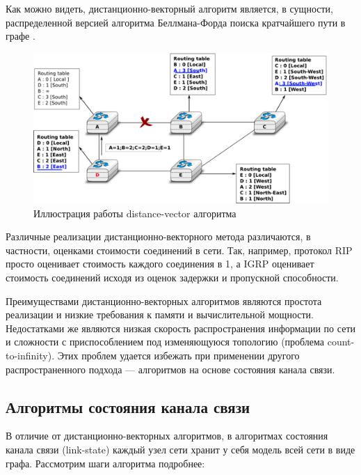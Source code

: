 \documentclass[specification, annotation]{itmo-student-thesis}
\begin{document}
Как можно видеть, дистанционно-векторный алгоритм является, в сущности,
распределенной версией алгоритма Беллмана-Форда поиска кратчайшего пути в
графе \cite{bellman-ford}.

\begin{figure}[!h]
  \caption{Иллюстрация работы distance-vector алгоритма}\label{rip-img}
  \centering
  \includegraphics[scale=1.5]{dv-failure-2}
\end{figure}

Различные реализации дистанционно-векторного метода различаются, в частности,
оценками стоимости соединений в сети. Так, например, протокол RIP \cite{rip-rfc} просто
оценивает стоимость каждого соединения в 1, а IGRP \cite{igrp-patent} оценивает
стоимость соединений исходя из оценок задержки и пропускной способности.

Преимуществами дистанционно-векторных алгоритмов являются простота реализации и
низкие требования к памяти и вычислительной мощности. Недостатками же являются
низкая скорость распространения информации по сети и сложности с приспособлением
под изменяющуюся топологию (проблема count-to-infinity). Этих проблем
удается избежать при применении другого распространенного подхода --- алгоритмов
на основе состояния канала связи. 

\subsection{Алгоритмы состояния канала связи}

В отличие от дистанционно-векторных алгоритмов, в алгоритмах состояния канала связи
(link-state) каждый узел сети хранит у себя модель всей сети в виде графа.
Рассмотрим шаги алгоритма подробнее:
\end{document}

